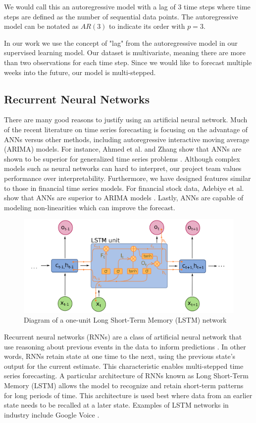 \documentclass[11pt, oneside]{article}
\begin{document}
We would call this an autoregressive model with a lag of 3 time steps where time steps are defined as the number of sequential data points. The autoregressive model can be notated as $AR(3)$ to indicate its order with $p=3$.

In our work we use the concept of "lag" from the autoregressive model in our supervised learning model. Our dataset is multivariate, meaning there are more than two observations for each time step. Since we would like to forecast multiple weeks into the future, our model is multi-stepped.

\subsection{Recurrent Neural Networks}

There are many good reasons to justify using an artificial neural network. Much of the recent literature on time series forecasting is focusing on the advantage of ANNs versus other methods, including autoregressive interactive moving average (ARIMA) models. For instance, Ahmed et al. and Zhang show that ANNs are shown to be superior for generalized time series problems \cite{ahmed}. Although complex models such as neural networks can hard to interpret, our project team values performance over interpretability. Furthermore, we have designed features similar to those in financial time series models. For financial stock data, Adebiye et al. show that ANNs are superior to ARIMA models \cite{adebiye}. Lastly, ANNs are capable of modeling non-linearities which can improve the forecast.

\begin{figure}[h]
  \caption{Diagram of a one-unit Long Short-Term Memory (LSTM) network \cite{deloche}}
  \centering
  \includegraphics[width=12.5cm]{images/Long_Short-Term_Memory.png}
\end{figure}

Recurrent neural networks (RNNs) are a class of artificial neural network that use reasoning about previous events in the data to inform predictions \cite{olah}. In other words, RNNs retain state at one time to the next, using the previous state's output for the current estimate. This characteristic enables multi-stepped time series forecasting. A particular architecture of RNNs known as Long Short-Term Memory (LSTM) allows the model to recognize and retain short-term patterns for long periods of time. This architecture is used best where data from an earlier state needs to be recalled at a later state. Examples of LSTM networks in industry include Google Voice \cite{beaufays}.
\end{document}

